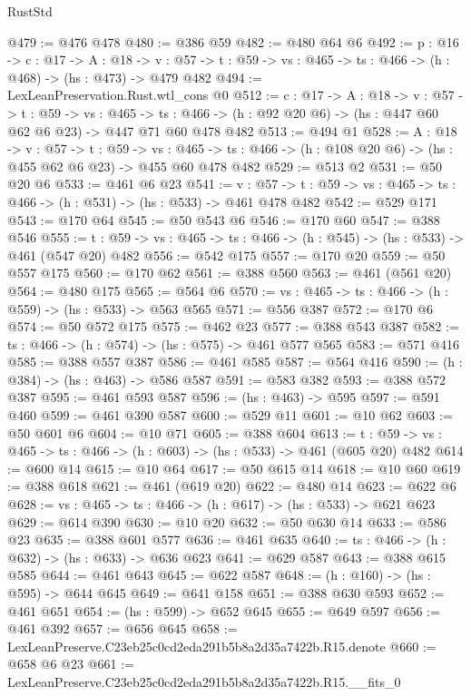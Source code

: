 \begin{lexlean}{RustStd}
\begin{coremodule}
@479 := @476 @478
@480 := @386 @59
@482 := @480 @64 @6
@492 := {p : @16} ->
  {c : @17} ->
  {A : @18} ->
  {v : @57} -> {t : @59} -> {vs : @465} -> {ts : @466} -> (h : @468) -> (hs : @473) -> @479 @482
@494 := LexLeanPreservation.Rust.wtl_cons @0
@512 := {c : @17} ->
  {A : @18} ->
  {v : @57} ->
  {t : @59} ->
  {vs : @465} ->
  {ts : @466} -> (h : @92 @20 @6) -> (hs : @447 @60 @62 @6 @23) -> @447 @71 @60 @478 @482
@513 := @494 @1
@528 := {A : @18} ->
  {v : @57} ->
  {t : @59} ->
  {vs : @465} -> {ts : @466} -> (h : @108 @20 @6) -> (hs : @455 @62 @6 @23) -> @455 @60 @478 @482
@529 := @513 @2
@531 := @50 @20 @6
@533 := @461 @6 @23
@541 := {v : @57} ->
  {t : @59} -> {vs : @465} -> {ts : @466} -> (h : @531) -> (hs : @533) -> @461 @478 @482
@542 := @529 @171
@543 := @170 @64
@545 := @50 @543 @6
@546 := @170 @60
@547 := @388 @546
@555 := {t : @59} -> {vs : @465} -> {ts : @466} -> (h : @545) -> (hs : @533) -> @461 (@547 @20) @482
@556 := @542 @175
@557 := @170 @20
@559 := @50 @557 @175
@560 := @170 @62
@561 := @388 @560
@563 := @461 (@561 @20)
@564 := @480 @175
@565 := @564 @6
@570 := {vs : @465} -> {ts : @466} -> (h : @559) -> (hs : @533) -> @563 @565
@571 := @556 @387
@572 := @170 @6
@574 := @50 @572 @175
@575 := @462 @23
@577 := @388 @543 @387
@582 := {ts : @466} -> (h : @574) -> (hs : @575) -> @461 @577 @565
@583 := @571 @416
@585 := @388 @557 @387
@586 := @461 @585
@587 := @564 @416
@590 := (h : @384) -> (hs : @463) -> @586 @587
@591 := @583 @382
@593 := @388 @572 @387
@595 := @461 @593 @587
@596 := (hs : @463) -> @595
@597 := @591 @460
@599 := @461 @390 @587
@600 := @529 @11
@601 := @10 @62
@603 := @50 @601 @6
@604 := @10 @71
@605 := @388 @604
@613 := {t : @59} -> {vs : @465} -> {ts : @466} -> (h : @603) -> (hs : @533) -> @461 (@605 @20) @482
@614 := @600 @14
@615 := @10 @64
@617 := @50 @615 @14
@618 := @10 @60
@619 := @388 @618
@621 := @461 (@619 @20)
@622 := @480 @14
@623 := @622 @6
@628 := {vs : @465} -> {ts : @466} -> (h : @617) -> (hs : @533) -> @621 @623
@629 := @614 @390
@630 := @10 @20
@632 := @50 @630 @14
@633 := @586 @23
@635 := @388 @601 @577
@636 := @461 @635
@640 := {ts : @466} -> (h : @632) -> (hs : @633) -> @636 @623
@641 := @629 @587
@643 := @388 @615 @585
@644 := @461 @643
@645 := @622 @587
@648 := (h : @160) -> (hs : @595) -> @644 @645
@649 := @641 @158
@651 := @388 @630 @593
@652 := @461 @651
@654 := (hs : @599) -> @652 @645
@655 := @649 @597
@656 := @461 @392
@657 := @656 @645
@658 := LexLeanPreserve.C23eb25c0cd2eda291b5b8a2d35a7422b.R15.denote
@660 := @658 @6 @23
@661 := LexLeanPreserve.C23eb25c0cd2eda291b5b8a2d35a7422b.R15.__fits_0

\end{coremodule}
\end{lexlean}
